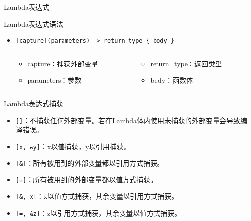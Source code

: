 \documentclass[UTF8,aspectratio=169]{beamer}
\begin{document}
\begin{frame}{Lambda表达式}
    \begin{ytublock}{Lambda表达式语法}
        \begin{itemize}
            \item \texttt{[capture](parameters) -> return\_type \{ body \}}
            \begin{columns}
                \begin{column}{0.5\textwidth}
                    \begin{itemize}
                        \item capture：捕获外部变量
                        \item parameters：参数
                    \end{itemize}
                \end{column}
                \begin{column}{0.5\textwidth}
                    \begin{itemize}
                        \item return\_type：返回类型
                        \item body：函数体
                    \end{itemize}
                \end{column}
            \end{columns}
        \end{itemize}
    \end{ytublock}

    \begin{ytublock}{Lambda表达式捕获}
        \begin{itemize}
            \item \texttt{[]}：不捕获任何外部变量。若在Lambda体内使用未捕获的外部变量会导致编译错误。
            \item \texttt{[x, \&y]}：x以值捕获，y以引用捕获。
            \item \texttt{[\&]}：所有被用到的外部变量都以引用方式捕获。
            \item \texttt{[=]}：所有被用到的外部变量都以值方式捕获。
            \item \texttt{[\&, x]}：x以值方式捕获，其余变量以引用方式捕获。
            \item \texttt{[=, \&z]}：z以引用方式捕获，其余变量以值方式捕获。
        \end{itemize}
    \end{ytublock}
\end{frame}
\end{document}
